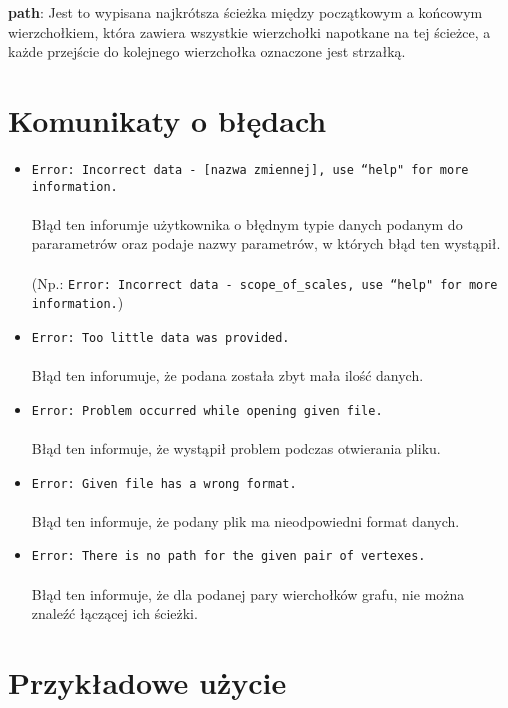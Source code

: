 \documentclass[12pt, a4paper]{article}
\begin{document}
\textbf{path}: Jest to wypisana najkrótsza ścieżka między początkowym a końcowym wierzchołkiem, która zawiera wszystkie wierzchołki napotkane na tej ścieżce, a każde przejście do kolejnego wierzchołka oznaczone jest strzałką.
\newpage
\section*{Komunikaty o błędach}
\begin{itemize}
\item \texttt{Error: Incorrect data \-- [nazwa zmiennej], use ``{help}" for more information.}\\\\
Błąd ten inforumje użytkownika o błędnym typie danych podanym do pararametrów oraz podaje nazwy parametrów, w których błąd ten wystąpił.\\\\
(Np.: \texttt{Error: Incorrect data \–- scope\_of\_scales, use ``help" for more information.})


\item \texttt{Error: Too little data was provided.}\\\\
Błąd ten inforumuje, że podana została zbyt mała ilość danych.
\item \texttt{Error: Problem occurred while opening given file.}\\\\
Błąd ten informuje, że wystąpił problem podczas otwierania pliku.
\item \texttt{Error: Given file has a wrong format.}\\\\
Błąd ten informuje, że podany plik ma nieodpowiedni format danych.
\item \texttt{Error: There is no path for the given pair of vertexes.}\\\\
Błąd ten informuje, że dla podanej pary wierchołków grafu, nie można znaleźć łączącej ich ścieżki.

\end{itemize}


\section{Przykładowe użycie}
\end{document}
